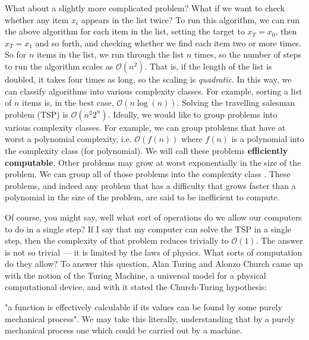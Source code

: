 What about a slightly more complicated problem? What if we want to check whether any item $x_i$ appears
in the list twice? To run this algorithm, we can run the above algorithm for each item in the list, setting the
target to $x_T = x_0$, then $x_T = x_1$ and so forth, and checking whether we find each item two or more
times. So for $n$ items in the list, we run through the list $n$ times, so the number of steps to run
the algorithm scales as $\mathcal{O}(n^2)$. That is, if the length of the list is doubled, it takes
four times as long, so the scaling is \emph{quadratic}.
In this way, we can classify algorithms into various complexity classes. For example, sorting a list
of $n$ items is, in the best case, $\mathcal{O}(n \log(n))$. Solving the travelling salesman problem (TSP) is
$\mathcal{O}(n^2 2^n)$. Ideally, we would like to group problems into various complexity classes. For example,
we can group problems that have at worst a polynomial complexity, i.e. $\mathcal{O}\left(f(n)\right)$ where $f(n)$
is a polynomial into the complexity class  (for polynomial). We will call these problems \textbf{efficiently
computable}. Other problems may grow at worst exponentially in the size of the problem. We can group all
of those problems into the complexity class . These problems, and indeed any problem that has a difficulty
that grows faster than a polynomial in the size of the problem, are said to be inefficient to compute.

Of course, you might say, well what sort of operations do we allow our computers to do in a single step?
If I say that my computer can solve the TSP in a single step, then the complexity of that problem reduces trivially to
$\mathcal{O}(1)$. The answer is not so trivial --- it is limited by the laws of physics. What sorts
of computation do they allow? To answer this question, Alan Turing and Alonzo Church came up with the notion of
the Turing Machine, a universal model for a physical computational device, and with it stated the Church-Turing
hypothesis:

\begin{displayquote}
  "a function is effectively calculable if its values can be found by some purely mechanical process".
  We may take this literally, understanding that by a purely mechanical process one which could be carried out by a machine.
\end{displayquote}


